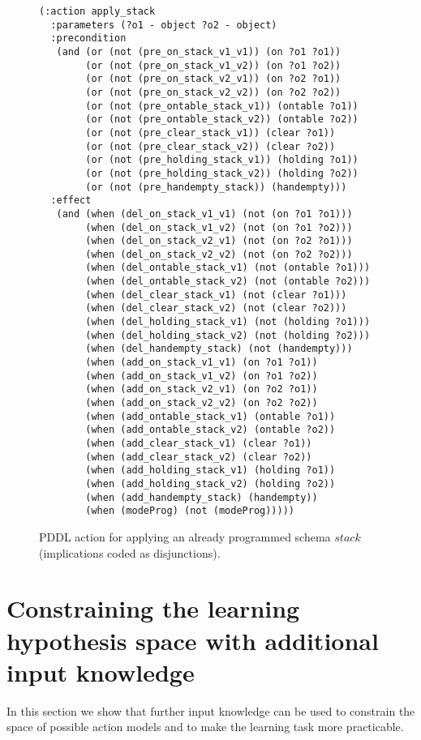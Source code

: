 \documentclass[letterpaper]{article} %
\begin{document}
\begin{figure}
\begin{scriptsize}
\begin{verbatim}
(:action apply_stack
  :parameters (?o1 - object ?o2 - object)
  :precondition
   (and (or (not (pre_on_stack_v1_v1)) (on ?o1 ?o1))
        (or (not (pre_on_stack_v1_v2)) (on ?o1 ?o2))
        (or (not (pre_on_stack_v2_v1)) (on ?o2 ?o1))
        (or (not (pre_on_stack_v2_v2)) (on ?o2 ?o2))
        (or (not (pre_ontable_stack_v1)) (ontable ?o1))
        (or (not (pre_ontable_stack_v2)) (ontable ?o2))
        (or (not (pre_clear_stack_v1)) (clear ?o1))
        (or (not (pre_clear_stack_v2)) (clear ?o2))
        (or (not (pre_holding_stack_v1)) (holding ?o1))
        (or (not (pre_holding_stack_v2)) (holding ?o2))
        (or (not (pre_handempty_stack)) (handempty)))
  :effect
   (and (when (del_on_stack_v1_v1) (not (on ?o1 ?o1)))
        (when (del_on_stack_v1_v2) (not (on ?o1 ?o2)))
        (when (del_on_stack_v2_v1) (not (on ?o2 ?o1)))
        (when (del_on_stack_v2_v2) (not (on ?o2 ?o2)))
        (when (del_ontable_stack_v1) (not (ontable ?o1)))
        (when (del_ontable_stack_v2) (not (ontable ?o2)))
        (when (del_clear_stack_v1) (not (clear ?o1)))
        (when (del_clear_stack_v2) (not (clear ?o2)))
        (when (del_holding_stack_v1) (not (holding ?o1)))
        (when (del_holding_stack_v2) (not (holding ?o2)))
        (when (del_handempty_stack) (not (handempty)))
        (when (add_on_stack_v1_v1) (on ?o1 ?o1))
        (when (add_on_stack_v1_v2) (on ?o1 ?o2))
        (when (add_on_stack_v2_v1) (on ?o2 ?o1))
        (when (add_on_stack_v2_v2) (on ?o2 ?o2))
        (when (add_ontable_stack_v1) (ontable ?o1))
        (when (add_ontable_stack_v2) (ontable ?o2))
        (when (add_clear_stack_v1) (clear ?o1))
        (when (add_clear_stack_v2) (clear ?o2))
        (when (add_holding_stack_v1) (holding ?o1))
        (when (add_holding_stack_v2) (holding ?o2))
        (when (add_handempty_stack) (handempty))
        (when (modeProg) (not (modeProg)))))
\end{verbatim}
\end{scriptsize}
 \caption{\small PDDL action for applying an already programmed schema $stack$ (implications coded as disjunctions).}
\label{fig:compilation}
\end{figure}


\section{Constraining the learning hypothesis space with additional input knowledge}
\label{sec:Constraining}
In this section we show that further input knowledge can be used to constrain the space of possible action models and to make the learning task more practicable.
\end{document}
